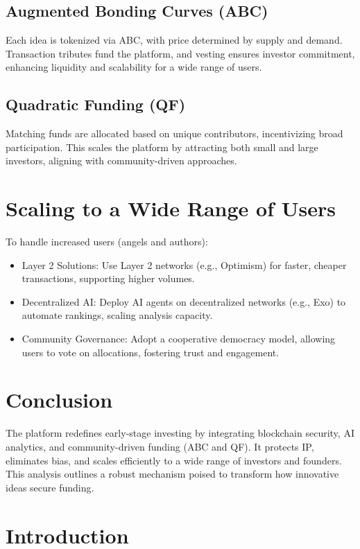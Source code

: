 \documentclass[12pt]{article}
\begin{document}
\subsection{Augmented Bonding Curves (ABC)}
Each idea is tokenized via ABC, with price determined by supply and demand. Transaction tributes fund the platform, and vesting ensures investor commitment, enhancing liquidity and scalability for a wide range of users.

\subsection{Quadratic Funding (QF)}
Matching funds are allocated based on unique contributors, incentivizing broad participation. This scales the platform by attracting both small and large investors, aligning with community-driven approaches.

\section{Scaling to a Wide Range of Users}
To handle increased users (angels and authors):
\begin{itemize}
  \item Layer 2 Solutions: Use Layer 2 networks (e.g., Optimism) for faster, cheaper transactions, supporting higher volumes.
  \item Decentralized AI: Deploy AI agents on decentralized networks (e.g., Exo) to automate rankings, scaling analysis capacity.
  \item Community Governance: Adopt a cooperative democracy model, allowing users to vote on allocations, fostering trust and engagement.
\end{itemize}

\section{Conclusion}

The platform redefines early-stage investing by integrating blockchain security, AI analytics, and community-driven funding (ABC and QF). It protects IP, eliminates bias, and scales efficiently to a wide range of investors and founders. This analysis outlines a robust mechanism poised to transform how innovative ideas secure funding.

\section{Introduction}
\end{document}
